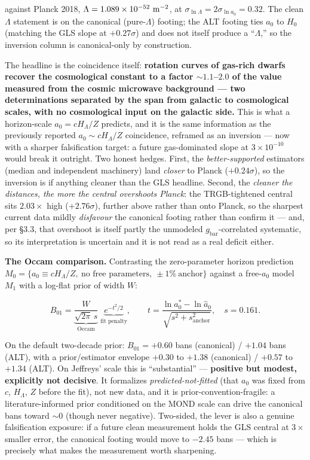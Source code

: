 \documentclass[
]{article}
\begin{document}
against Planck 2018, \(\Lambda=1.089\times10^{-52}\ {\rm m^{-2}}\), at
\(\sigma_{\ln\Lambda}=2\sigma_{\ln a_0}=0.32\). The clean \(\Lambda\)
statement is on the canonical (pure-\(\Lambda\)) footing; the ALT
footing ties \(a_0\) to \(H_0\) (matching the GLS slope at
\(+0.27\sigma\)) and does not itself produce a ``\(\Lambda\),'' so the
inversion column is canonical-only by construction.

The headline is the coincidence itself: \textbf{rotation curves of
gas-rich dwarfs recover the cosmological constant to a factor
\(\sim1.1\)--\(2.0\) of the value measured from the cosmic microwave
background --- two determinations separated by the span from galactic to
cosmological scales, with no cosmological input on the galactic side.}
This is what a horizon-scale \(a_0=cH_\Lambda/Z\) predicts, and it is
the same information as the previously reported \(a_0\sim cH_\Lambda/Z\)
coincidence, reframed as an inversion --- now with a sharper
falsification target: a future gas-dominated slope at
\(3\times10^{-10}\) would break it outright. Two honest hedges. First,
the \emph{better-supported} estimators (median and independent
machinery) land \emph{closer} to Planck (\(+0.24\sigma\)), so the
inversion is if anything cleaner than the GLS headline. Second, the
\emph{cleaner the distances, the more the central overshoots Planck}:
the TRGB-tightened central sits \(2.03\times\) high (\(+2.76\sigma\)),
further above rather than onto Planck, so the sharpest current data
mildly \emph{disfavour} the canonical footing rather than confirm it ---
and, per §3.3, that overshoot is itself partly the unmodeled
\(g_\mathrm{bar}\)-correlated systematic, so its interpretation is
uncertain and it is not read as a real deficit either.

\textbf{The Occam comparison.} Contrasting the zero-parameter horizon
prediction
\(M_0=\{a_0\equiv cH_\Lambda/Z,\ \text{no free parameters},\ \pm1\%\ \text{anchor}\}\)
against a free-\(a_0\) model \(M_1\) with a log-flat prior of width
\(W\):

\[B_{01}=\underbrace{\frac{W}{\sqrt{2\pi}\,s}}_{\text{Occam}}\;\underbrace{e^{-t^2/2}}_{\text{fit penalty}},\qquad t=\frac{\ln a_0^*-\ln\hat a_0}{\sqrt{s^2+s_\mathrm{anchor}^2}},\quad s=0.161.\]

On the default two-decade prior: \(B_{01}=+0.60\) bans (canonical) /
\(+1.04\) bans (ALT), with a prior/estimator envelope \(+0.30\) to
\(+1.38\) (canonical) / \(+0.57\) to \(+1.34\) (ALT). On Jeffreys' scale
this is ``substantial'' --- \textbf{positive but modest, explicitly not
decisive}. It formalizes \emph{predicted-not-fitted} (that \(a_0\) was
fixed from \(c\), \(H_\Lambda\), \(Z\) before the fit), not new data,
and it is prior-convention-fragile: a literature-informed prior
conditioned on the MOND scale can drive the canonical bans toward
\(\sim0\) (though never negative). Two-sided, the lever is also a
genuine falsification exposure: if a future clean measurement holds the
GLS central at \(3\times\) smaller error, the canonical footing would
move to \(-2.45\) bans --- which is precisely what makes the measurement
worth sharpening.
\end{document}
